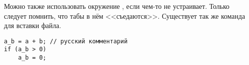 



Можно также использовать окружение , если  чем-то не
устраивает. Только следует помнить, что табы в нём <<съедаются>>. Существует так же команда  для вставки файла.

\begin{verbatim}
a_b = a + b; // русский комментарий
if (a_b > 0)
    a_b = 0;
\end{verbatim}


